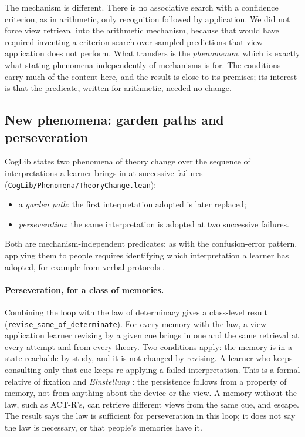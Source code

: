 \documentclass[11pt]{article}
\newcommand{\code}[1]{\texttt{#1}}
\newcommand{\lean}[1]{\texttt{#1}}
\begin{document}
The mechanism is different. There is no associative search with a confidence criterion, as in arithmetic, only recognition followed by application. We did not force view retrieval into the arithmetic mechanism, because that would have required inventing a criterion search over sampled predictions that view application does not perform. What transfers is the \emph{phenomenon}, which is exactly what stating phenomena independently of mechanisms is for. The conditions carry much of the content here, and the result is close to its premises; its interest is that the predicate, written for arithmetic, needed no change.

\subsection{New phenomena: garden paths and perseveration}

CogLib states two phenomena of theory change over the sequence of interpretations a learner brings in at successive failures (\code{CogLib/Phenomena/TheoryChange.lean}):
\begin{itemize}
  \item a \emph{garden path}: the first interpretation adopted is later replaced;
  \item \emph{perseveration}: the same interpretation is adopted at two successive failures.
\end{itemize}
Both are mechanism-independent predicates; as with the confusion-error pattern, applying them to people requires identifying which interpretation a learner has adopted, for example from verbal protocols \citep{shrager1986}.

\paragraph{Perseveration, for a class of memories.} Combining the loop with the law of determinacy gives a class-level result (\lean{revise\_same\_of\_determinate}). For every memory with the law, a view-application learner revising by a given cue brings in one and the same retrieval at every attempt and from every theory. Two conditions apply: the memory is in a state reachable by study, and it is not changed by revising. A learner who keeps consulting only that cue keeps re-applying a failed interpretation. This is a formal relative of fixation and \emph{Einstellung} \citep{luchins1942}: the persistence follows from a property of memory, not from anything about the device or the view. A memory without the law, such as ACT-R's, can retrieve different views from the same cue, and escape. The result says the law is sufficient for perseveration in this loop; it does not say the law is necessary, or that people's memories have it.
\end{document}
